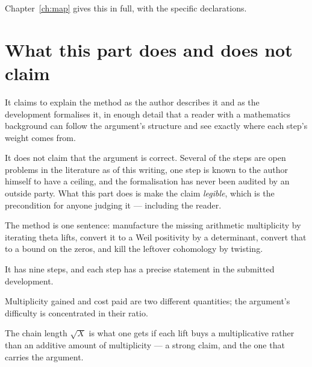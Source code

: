 Chapter~\ref{ch:map} gives this in full, with the specific declarations.

\section{What this part does and does not claim}It claims to explain the method as the author describes it and as the
development formalises it, in enough detail that a reader with a mathematics
background can follow the argument's structure and see exactly where each
step's weight comes from.

It does not claim that the argument is correct. Several of the steps are open
problems in the literature as of this writing, one step is known to the author
himself to have a ceiling, and the formalisation has never been audited by an
outside party. What this part does is make the claim \emph{legible}, which is
the precondition for anyone judging it --- including the reader.

\begin{keytakeaways}
\item The method is one sentence: manufacture the missing arithmetic
multiplicity by iterating theta lifts, convert it to a Weil positivity by a
determinant, convert that to a bound on the zeros, and kill the leftover
cohomology by twisting.
\item It has nine steps, and each step has a precise statement in the
submitted development.
\item Multiplicity gained and cost paid are two different quantities; the
argument's difficulty is concentrated in their ratio.
\item The chain length $\sqrt{X}$ is what one gets if each lift buys a
multiplicative rather than an additive amount of multiplicity --- a strong
claim, and the one that carries the argument.
\end{keytakeaways}
